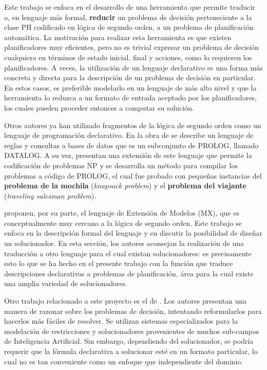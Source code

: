 Este trabajo se enfoca en el desarrollo de una herramienta que permite
traducir o, en lenguaje más formal, \textbf{reducir} un problema de
decisión perteneciente a la clase PH codificado en lógica de segundo orden,
a un problema de planificación automática. 
La motivación para realizar esta herramienta es que
existen planificadores muy eficientes, pero no es trivial
expresar un problema de decisión cualquiera en términos de estado inicial,
final y acciones, como lo requieren los
planificadores. A veces, la utilización de un lenguaje declarativo es una forma
más concreta y directa para la descripción de un problema de decisión en
particular. En estos casos, es preferible modelarlo en un lenguaje de más alto
nivel y que la herramienta lo reduzca a un formato de entrada aceptado por
los planificadores, los cuales pueden proceder entonces a computar su solución.

Otros autores ya han utilizado fragmentos de la lógica de segundo orden como un lenguaje de
programación declarativo. En la obra de \cite{reiter:cwa} se describe un
lenguaje de reglas y consultas a bases de datos que es un subconjunto de
PROLOG, llamado DATALOG. A su vez, \cite{cadoli:npspec} presentan una
extensión de este lenguaje que permite la codificación de problemas NP y
se desarrolla un método para compilar los problemas a código de PROLOG, el cual
fue probado con pequeñas instancias del \textbf{problema de la mochila}
(\textit{knapsack problem}) y el \textbf{problema del viajante}
(\textit{traveling salesman problem}).

\cite{mitchell:npsearch} proponen, por su parte, el lenguaje de
Extensión de Modelos (MX), que es conceptualmente muy cercano a la lógica de
segundo orden. Este trabajo se enfoca en la descripción formal del lenguaje y
en discutir la posibilidad de diseñar un solucionador. En esta sección, los
autores aconsejan la realización de una traducción a otro lenguaje para el cual
existan solucionadores: es precisamente esto lo que se ha hecho en el presente
trabajo con la función que traduce descripciones declarativas a problemas
de planificación, área para la cual existe una amplia variedad de solucionadores.

Otro trabajo relacionado a este proyecto es el de \cite{cadoli:safedelay}. Los
autores presentan una manera de razonar sobre los problemas de
decisión, intentando reformularlos para hacerlos más fáciles de resolver. Se
utilizan sistemas especializados para la modelación de restricciones y
solucionadores provenientes de muchos sub-campos de Inteligencia Artificial.
Sin embargo, dependiendo del solucionador, se podría requerir que la fórmula
declarativa a solucionar esté en un formato particular, lo cual no es tan
conveniente como un enfoque que independiente del dominio.

